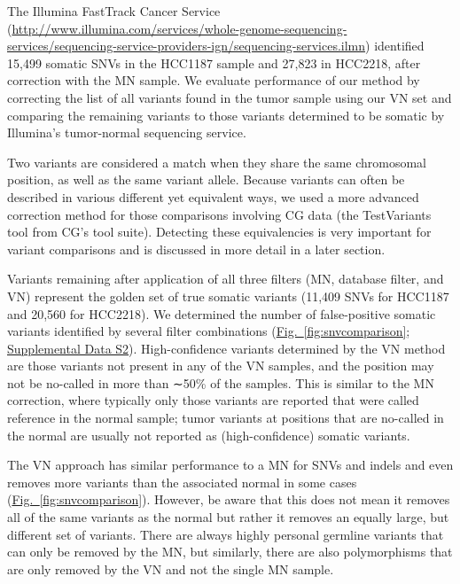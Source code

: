 The Illumina FastTrack Cancer Service (\url{http://www.illumina.com/services/whole-genome-sequencing-services/sequencing-service-providers-ign/sequencing-services.ilmn}) identified 15,499 somatic SNVs in the HCC1187 sample and 27,823 in HCC2218, after correction with the MN sample. We evaluate performance of our method by correcting the list of all variants found in the tumor sample using our VN set and comparing the remaining variants to those variants determined to be somatic by Illumina's tumor-normal sequencing service.

Two variants are considered a match when they share the same chromosomal position, as well as the same variant allele. Because variants can often be described in various different yet equivalent ways, we used a more advanced correction method for those comparisons involving CG data (the TestVariants tool from CG's tool suite). Detecting these equivalencies is very important for variant comparisons and is discussed in more detail in a later section.

Variants remaining after application of all three filters (MN, database filter, and VN) represent the golden set of true somatic variants (11,409 SNVs for HCC1187 and 20,560 for HCC2218). We determined the number of false-positive somatic variants identified by several filter combinations (\hyperref[fig:snvcomparison]{Fig.~\ref{fig:snvcomparison}}; \href{https://genome.cshlp.org/content/25/9/1382/suppl/DC1}{Supplemental Data S2}). High-confidence variants determined by the VN method are those variants not present in any of the VN samples, and the position may not be no-called in more than ∼50\% of the samples. This is similar to the MN correction, where typically only those variants are reported that were called reference in the normal sample; tumor variants at positions that are no-called in the normal are usually not reported as (high-confidence) somatic variants.

The VN approach has similar performance to a MN for SNVs and indels and even removes more variants than the associated normal in some cases (\hyperref[fig:snvcomparison]{Fig.~\ref{fig:snvcomparison}}). However, be aware that this does not mean it removes all of the same variants as the normal but rather it removes an equally large, but different set of variants. There are always highly personal germline variants that can only be removed by the MN, but similarly, there are also polymorphisms that are only removed by the VN and not the single MN sample.

